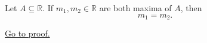 \begin{proposition}
\label{prop:uniqueness-of-the-maximum}
Let $A\subseteq\mathbb{R}$. If $m_1,m_2\in\mathbb{R}$ are both maxima of
$A$, then
\[
  m_1=m_2.
\]

\hyperref[prf:uniqueness-of-the-maximum]{Go to proof.}
\end{proposition}
